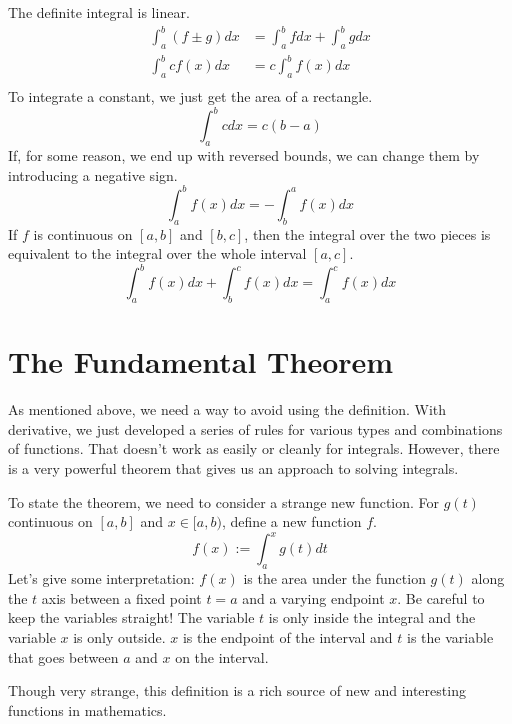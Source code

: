 \documentclass[fleqn]{report}
\begin{document}
The definite integral is linear.
\begin{align*} 
\int_a^b (f \pm g) dx & = \int_a^b f dx + \int_a^b g dx \\
\int_a^b c f(x) dx & = c \int_a^b f(x) dx \\
\end{align*}
To integrate a constant, we just get the area of a rectangle.
\begin{equation*}
\int_a^b c dx = c(b-a)
\end{equation*}
If, for some reason, we end up with reversed bounds, we can
change them by introducing a negative sign.
\begin{equation*}
\int_a^b f(x) dx = - \int_b^a f(x) dx 
\end{equation*}
If $f$ is continuous on $[a,b]$ and $[b,c]$, then the integral
over the two pieces is equivalent to the integral over the
whole interval $[a,c]$.
\begin{equation*} 
\int_a^bf(x) dx + \int_b^c f(x) dx = \int_a^c f(x) dx 
\end{equation*}

\chapter{The Fundamental Theorem} 
\label{The Fundamental Theorem}

As mentioned above, we need a way to avoid using the
definition. With derivative, we just developed a series of
rules for various types and combinations of functions. That
doesn't work as easily or cleanly for integrals. However,
there is a very powerful theorem that gives us an approach to
solving integrals.

To state the theorem, we need to consider a strange new
function. For $g(t)$ continuous on $[a,b]$ and $x \in [a,b)$,
define a new function $f$.
\begin{equation*}
f(x) := \int_a^x g(t) dt 
\end{equation*}
Let's give some interpretation: $f(x)$ is the area under the
function $g(t)$ along the $t$ axis between a fixed point
$t=a$ and a varying endpoint $x$. Be careful to keep the
variables straight! The variable $t$ is only inside the
integral and the variable $x$ is only outside. $x$ is the
endpoint of the interval and $t$ is the variable that goes
between $a$ and $x$ on the interval.

Though very strange, this definition is a rich source of new and
interesting functions in mathematics. 
\end{document}
